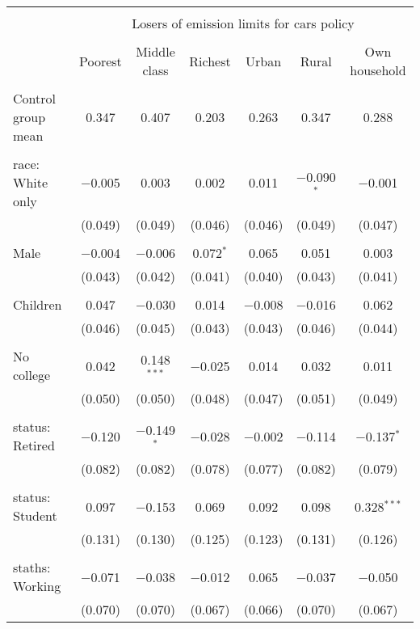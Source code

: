
\begin{tabular}{@{\extracolsep{5pt}}lcccccc} 
\\[-1.8ex]\hline 
\hline \\[-1.8ex] 
 & \multicolumn{6}{c}{Losers of emission limits for cars policy} \\ 
\cline{2-7} 
\\[-1.8ex] & Poorest & Middle class & Richest & Urban & Rural & Own household \\ 
\hline \\[-1.8ex] 
 Control group mean & 0.347 & 0.407 & 0.203 & 0.263 & 0.347 & 0.288  \\ \hline \\[-1.8ex] race: White only & $-$0.005 & 0.003 & 0.002 & 0.011 & $-$0.090$^{*}$ & $-$0.001 \\ 
  & (0.049) & (0.049) & (0.046) & (0.046) & (0.049) & (0.047) \\ 
  & & & & & & \\ 
 Male & $-$0.004 & $-$0.006 & 0.072$^{*}$ & 0.065 & 0.051 & 0.003 \\ 
  & (0.043) & (0.042) & (0.041) & (0.040) & (0.043) & (0.041) \\ 
  & & & & & & \\ 
 Children & 0.047 & $-$0.030 & 0.014 & $-$0.008 & $-$0.016 & 0.062 \\ 
  & (0.046) & (0.045) & (0.043) & (0.043) & (0.046) & (0.044) \\ 
  & & & & & & \\ 
 No college & 0.042 & 0.148$^{***}$ & $-$0.025 & 0.014 & 0.032 & 0.011 \\ 
  & (0.050) & (0.050) & (0.048) & (0.047) & (0.051) & (0.049) \\ 
  & & & & & & \\ 
 status: Retired & $-$0.120 & $-$0.149$^{*}$ & $-$0.028 & $-$0.002 & $-$0.114 & $-$0.137$^{*}$ \\ 
  & (0.082) & (0.082) & (0.078) & (0.077) & (0.082) & (0.079) \\ 
  & & & & & & \\ 
 status: Student & 0.097 & $-$0.153 & 0.069 & 0.092 & 0.098 & 0.328$^{***}$ \\ 
  & (0.131) & (0.130) & (0.125) & (0.123) & (0.131) & (0.126) \\ 
  & & & & & & \\ 
 staths: Working & $-$0.071 & $-$0.038 & $-$0.012 & 0.065 & $-$0.037 & $-$0.050 \\ 
  & (0.070) & (0.070) & (0.067) & (0.066) & (0.070) & (0.067) \\ 

\end{tabular}
